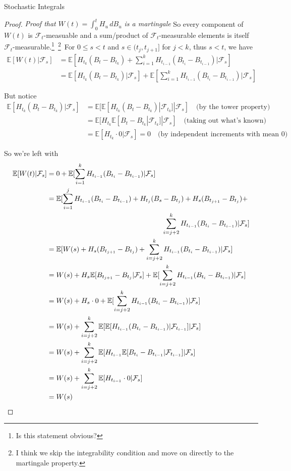 \documentclass[12pt]{article}
\newlength\tindent
\renewcommand{\indent}{\hspace*{\tindent}}
\begin{document}
\begin{section}{Stochastic Integrals}
\begin{proof} {\em Proof that $W(t) = \int^t_0 H_u\,dB_u$ is a martingale}
\indent So every component of $W(t)$ is $\mathcal F_t$-measuable and a sum/product of $\mathcal F_t$-measurable elements is itself $\mathcal F_t$-measurable.\footnote{Is this statement obvious?}~\footnote{I think we skip the integrability condition and move on directly to the martingale property.}~For $0 \leq s < t$ and $s \in (t_j, t_{j+1}]$ for $j < k$, thus $s < t$, we have
\begin{align*}
	\mathbb E[W(t)|\mathcal F_s] &= \mathbb E[ H_{t_k}(B_t - B_{t_k}) + \sum^k_{i = 1} H_{t_{i-1}} (B_{t_i} - B_{t_{i-1}})|\mathcal F_s] \\
	&= \mathbb E[H_{t_k}(B_t - B_{t_k})|\mathcal F_s]  + \mathbb E[\sum^k_{i = 1} H_{t_{i-1}} (B_{t_i} - B_{t_{i-1}})|\mathcal F_s]
\end{align*}

But notice
\begin{align*}
	\mathbb E[H_{t_k}(B_t - B_{t_k})|\mathcal F_s] &= \mathbb E[\mathbb E[H_{t_k}(B_t - B_{t_k})|\mathcal F_{t_k}]|\mathcal F_s] \quad \text{(by the tower property)} \\ 
	&= \mathbb E[H_{t_k} \mathbb E[B_t - B_{t_k}|\mathcal F_{t_k}]|\mathcal F_s] \quad \text{(taking out what's known)}\\
	&= \mathbb E[H_{t_k}\cdot 0 |\mathcal F_s] = 0 \quad \text{(by independent increments with mean 0)}
\end{align*}

So we're left with
\begin{align*}
	\mathbb E[W(t)|\mathcal F_s] &= 0 + \mathbb E[\sum^k_{i = 1} H_{t_{i-1}} (B_{t_i} - B_{t_{i-1}})|\mathcal F_s]\\
	&=  \mathbb E[\sum^j_{i = 1} H_{t_{i-1}} (B_{t_i} - B_{t_{i-1}}) + H_{t_{j}} (B_{s} - B_{t_{j}}) + H_{s} (B_{t_{j+1}} - B_{t_{j}}) + \\
	&\hphantom{{}=\mathbb E[\sum^j_{i = 1} H_{t_{i-1}} (B_{t_i} - B_{t_{i-1}}) + H_{t_{j}} (B_{s}} \sum^k_{i = j + 2} H_{t_{i-1}} (B_{t_i} - B_{t_{i-1}})|\mathcal F_s] \\
	&= \mathbb E[W(s) + H_{s} (B_{t_{j+1}} - B_{t_{j}}) + \sum^k_{i = j + 2} H_{t_{i-1}} (B_{t_i} - B_{t_{i-1}})|\mathcal F_s]  \\
	&= W(s) + H_s\mathbb E[B_{t_{j+1}} - B_{t_{j}}|\mathcal F_s] + \mathbb E[\sum^k_{i = j + 2} H_{t_{i-1}} (B_{t_i} - B_{t_{i-1}})|\mathcal F_s] \\
	&= W(s) + H_s\cdot0 + \mathbb E[\sum^k_{i = j + 2} H_{t_{i-1}} (B_{t_i} - B_{t_{i-1}})|\mathcal F_s] \\
	&=  W(s) + \sum^k_{i = j + 2} \mathbb E[\mathbb E[H_{t_{i-1}} (B_{t_i} - B_{t_{i-1}})|\mathcal F_{t_{i-1}}]|\mathcal F_s]  \\
	&= W(s) + \sum^k_{i = j + 2} \mathbb E[H_{t_{i-1}} \mathbb E[B_{t_i} - B_{t_{i-1}}|\mathcal F_{t_{i-1}}]|\mathcal F_s] \\
	&= W(s) + \sum^k_{i = j + 2} \mathbb E[H_{t_{i-1}}\cdot 0|\mathcal F_s] \\
	&= W(s)
\end{align*} 
\end{proof}


\end{section}
\end{document}
